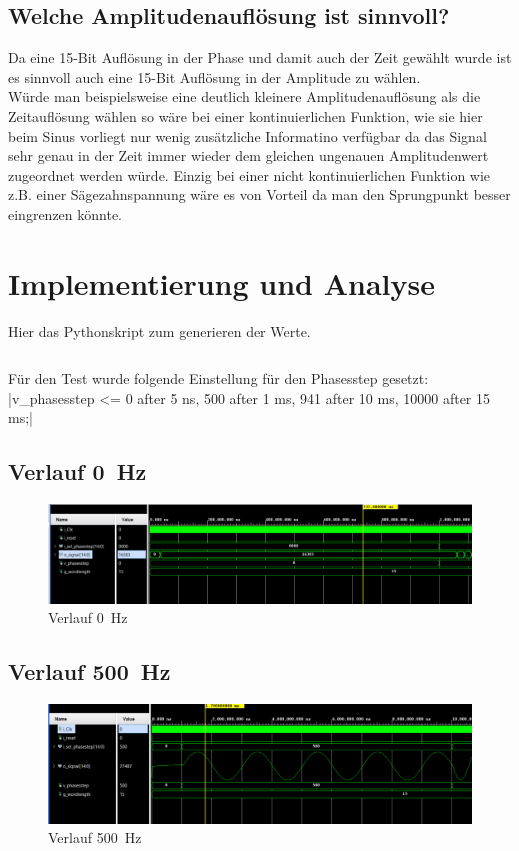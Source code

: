 \documentclass[a4paper,11pt,DIV=11,parskip=half]{scrartcl}
\begin{document}
\subsection{Welche Amplitudenauflösung ist sinnvoll?}
Da eine 15-Bit Auflösung in der Phase und damit auch der Zeit gewählt wurde ist es sinnvoll auch eine 15-Bit Auflösung in der Amplitude zu wählen. \\
Würde man beispielsweise eine deutlich kleinere Amplitudenauflösung als die Zeitauflösung wählen so wäre bei einer kontinuierlichen Funktion, wie sie hier beim Sinus vorliegt nur wenig zusätzliche Informatino verfügbar da das Signal sehr genau in der Zeit immer wieder dem gleichen ungenauen Amplitudenwert zugeordnet werden würde.
Einzig bei einer nicht kontinuierlichen Funktion wie z.B. einer Sägezahnspannung wäre es von Vorteil da man den Sprungpunkt besser eingrenzen könnte. 

\section{Implementierung und Analyse}
Hier das Pythonskript zum generieren der Werte.
\inputminted{python3}{../Labor4/Romgenerator_sine.py}
Für den Test wurde folgende Einstellung für den Phasesstep gesetzt: \\
|v_phasesstep <= 0 after 5 ns, 500 after 1 ms, 941 after 10 ms, 10000 after 15 ms;|
\subsection{Verlauf \SI{0}{Hz}}
\begin{figure}[H]
	\centering
	\includegraphics[width=\textwidth]{Bilder/DDS_0Hz.png}
	\caption{Verlauf \SI{0}{Hz}}
	\label{fig:tb_0Hz}
\end{figure}
\subsection{Verlauf \SI{500}{Hz}}
\begin{figure}[H]
	\centering
	\includegraphics[width=\textwidth]{Bilder/DDS_500Hz.png}
	\caption{Verlauf \SI{500}{Hz}}
	\label{fig:tb_500Hz}
\end{figure}
\end{document}
